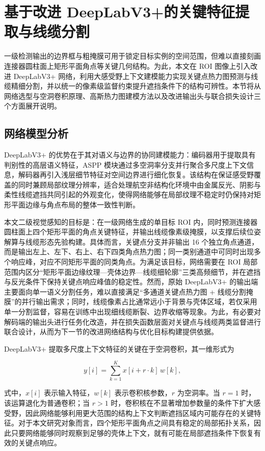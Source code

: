 \section{基于改进 DeepLabV3+的关键特征提取与线缆分割}
一级检测输出的边界框与粗掩膜可用于锁定目标实例的空间范围，但难以直接刻画连接器圆柱面上矩形平面角点等关键几何结构。为此，本文在 ROI 图像上引入改进 DeepLabV3+ 网络，利用大感受野上下文建模能力实现关键点热力图预测与线缆精细分割，并以统一的像素级监督约束提升遮挡条件下的结构可辨性。本节将从网络选型与空洞卷积原理、高斯热力图建模方法以及改进输出头与联合损失设计三个方面展开说明。

\subsection{网络模型分析}
DeepLabV3+ 的优势在于其对语义与边界的协同建模能力：编码器用于提取具有判别性的高层语义特征，ASPP 模块通过多空洞率分支并行聚合多尺度上下文信息，解码器再引入浅层细节特征对空间边界进行细化恢复。该结构在保证感受野覆盖的同时兼顾局部纹理分辨率，适合处理航空非结构化环境中由金属反光、阴影与柔性线缆遮挡共同引起的外观变化，使得网络能够在局部纹理不稳定时仍保持对矩形平面边缘与角点布局的整体一致性判断。

本文二级视觉感知的目标是：在一级网络生成的单目标 ROI 内，同时预测连接器圆柱面上四个矩形平面的角点关键特征，并输出线缆像素级掩膜，以支撑后续位姿解算与线缆形态先验构建。具体而言，关键点分支并非输出 16 个独立角点通道，而是输出左上、左下、右上、右下四类角点热力图；同一类别通道中可同时出现多个响应峰，对应不同矩形平面的同类角点。为满足该目标，网络需要在 ROI 局部范围内区分“矩形平面边缘纹理—壳体边界—线缆细轮廓”三类高频细节，并在遮挡与反光条件下保持关键点响应峰值的稳定性。然而，原始 DeepLabV3+ 的输出端主要面向单一语义分割任务，难以直接满足“多通道关键点热力图 + 线缆分割掩膜”的并行输出需求；同时，线缆像素占比通常远小于背景与壳体区域，若仅采用单一分割监督，容易在训练中出现细线缆断裂、边界收缩等现象。为此，有必要对解码端的输出头进行任务化改造，并在损失函数层面对关键点与线缆两类监督进行联合设计，从而为下一节的改进网络结构与优化目标构建提供依据。

DeepLabV3+ 提取多尺度上下文特征的关键在于空洞卷积，其一维形式为

$$
y[i]=\sum_{k=1}^{K}x[i+r\cdot k]\,w[k],
$$

式中，\(x[i]\) 表示输入特征，\(w[k]\) 表示卷积核参数，\(r\) 为空洞率。当 \(r=1\) 时，该运算退化为普通卷积；当 \(r>1\) 时，卷积核在不显著增加参数量的条件下扩大感受野，因此网络能够利用更大范围的结构上下文判断遮挡区域内可能存在的关键特征。对于本文研究对象而言，四个矩形平面角点之间具有稳定的局部拓扑关系，因此只要网络能够同时观察到足够的壳体上下文，就有可能在局部遮挡条件下恢复有效的关键点响应。

